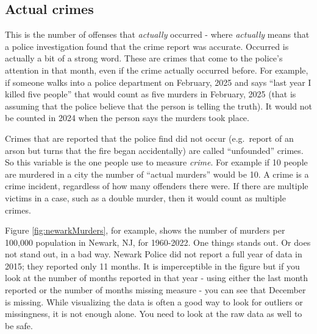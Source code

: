 \documentclass[
]{krantz}
\begin{document}
\subsection{Actual crimes}\label{actual}

This is the number of offenses that \emph{actually} occurred
- where \emph{actually} means that a police investigation
found that the crime report was accurate. Occurred is
actually a bit of a strong word. These are crimes that come
to the police's attention in that month, even if the crime
actually occurred before. For example, if someone walks into
a police department on February, 2025 and says ``last year I
killed five people'' that would count as five murders in
February, 2025 (that is assuming that the police believe
that the person is telling the truth). It would not be
counted in 2024 when the person says the murders took place.

Crimes that are reported that the police find did not occur
(e.g.~report of an arson but turns that the fire began
accidentally) are called ``unfounded'' crimes. So this
variable is the one people use to measure \emph{crime}. For
example if 10 people are murdered in a city the number of
``actual murders'' would be 10. A crime is a crime incident,
regardless of how many offenders there were. If there are
multiple victims in a case, such as a double murder, then it
would count as multiple crimes.

Figure \ref{fig:newarkMurders}, for example, shows the
number of murders per 100,000 population in Newark, NJ, for
1960-2022. One things stands out. Or does not stand out, in
a bad way. Newark Police did not report a full year of data
in 2015; they reported only 11 months. It is imperceptible
in the figure but if you look at the number of months
reported in that year - using either the last month reported
or the number of months missing measure - you can see that
December is missing. While visualizing the data is often a
good way to look for outliers or missingness, it is not
enough alone. You need to look at the raw data as well to be
safe.
\end{document}
